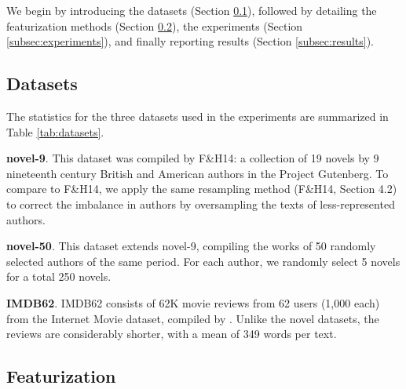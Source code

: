 We begin by introducing the datasets (Section \ref{subsec:datasets}), followed by detailing the featurization methods (Section \ref{subsec:featurization}), the experiments (Section \ref{subsec:experiments}), and finally reporting results (Section \ref{subsec:results}). 

\subsection{Datasets}
\label{subsec:datasets}
The statistics for the three datasets used in the experiments are summarized in Table \ref{tab:datasets}.
\begin{table}
\begin{center}
\vspace{-1.5em}
\caption{Statistics for datasets.}
\label{tab:datasets}
\end{center}
\end{table}
\medskip

\noindent
\textbf{novel-9}.
This dataset was compiled by F\&H14: a collection of 19 novels by 9 nineteenth century British and American authors in the Project Gutenberg. To compare to F\&H14, we apply the same resampling method (F\&H14, Section 4.2) to correct the imbalance in authors by oversampling the texts of less-represented authors.
\medskip

\noindent
\textbf{novel-50}.
This dataset extends novel-9, compiling the works of 50 randomly selected authors of the same period. 
For each author, we randomly select 5 novels for a total 250 novels.
\medskip

\noindent
\textbf{IMDB62}.
IMDB62 consists of 62K movie reviews from 62 users (1,000 each) from the Internet Movie dataset, compiled by . Unlike the novel datasets, the reviews are considerably shorter, with a mean of 349 words per text.

\subsection{Featurization}
\label{subsec:featurization}

